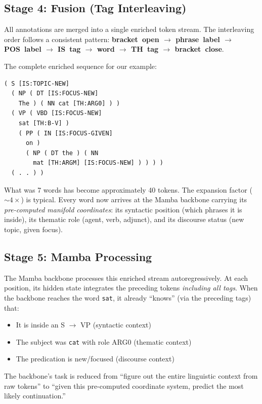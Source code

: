 \documentclass[11pt]{article}
\begin{document}
\subsection*{Stage 4: Fusion (Tag Interleaving)}

All annotations are merged into a single enriched token stream.
The interleaving order follows a consistent pattern: 
\textbf{bracket~open $\to$ phrase~label $\to$ POS~label $\to$ 
IS~tag $\to$ word $\to$ TH~tag $\to$ bracket~close}.

The complete enriched sequence for our example:

\begin{small}
\begin{verbatim}
( S [IS:TOPIC-NEW]
  ( NP ( DT [IS:FOCUS-NEW]
    The ) ( NN cat [TH:ARG0] ) )
  ( VP ( VBD [IS:FOCUS-NEW]
    sat [TH:B-V] )
    ( PP ( IN [IS:FOCUS-GIVEN]
      on )
      ( NP ( DT the ) ( NN
        mat [TH:ARGM] [IS:FOCUS-NEW] ) ) ) )
  ( . . ) )
\end{verbatim}
\end{small}

\noindent
What was 7 words has become approximately 40 tokens. The expansion 
factor (${\sim}4\times$) is typical. Every word now arrives at the 
Mamba backbone carrying its \emph{pre-computed manifold coordinates}: 
its syntactic position (which phrases it is inside), its thematic role 
(agent, verb, adjunct), and its discourse status (new topic, given 
focus).

\subsection*{Stage 5: Mamba Processing}

The Mamba backbone processes this enriched stream autoregressively. 
At each position, its hidden state integrates the preceding tokens 
\emph{including all tags}. When the backbone reaches the word 
\texttt{sat}, it already ``knows'' (via the preceding tags) that:

\begin{itemize}
\item It is inside an S $\to$ VP (syntactic context)
\item The subject was \texttt{cat} with role ARG0 (thematic context)
\item The predication is new/focused (discourse context)
\end{itemize}

The backbone's task is reduced from ``figure out the entire 
linguistic context from raw tokens'' to ``given this pre-computed 
coordinate system, predict the most likely continuation.''
\end{document}
